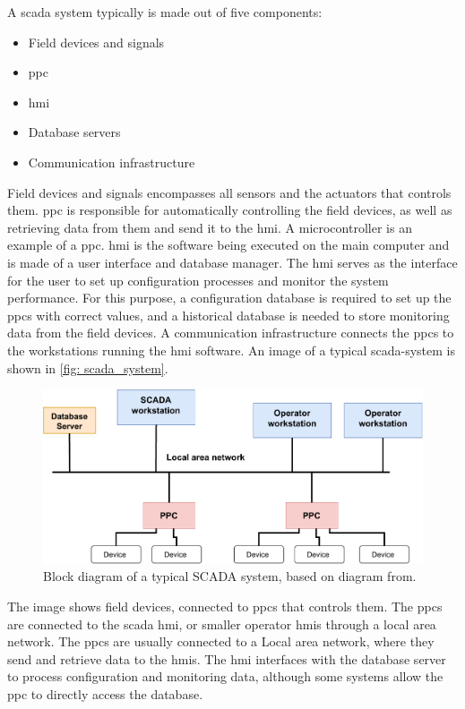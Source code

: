 \documentclass[main.tex]{subfiles}
\begin{document}
A \gls{scada} system typically is made out of five components:

\begin{itemize}
    \item Field devices and signals
    \item \acrfull{ppc}
    \item \acrfull{hmi}
    \item Database servers
    \item Communication infrastructure
\end{itemize}

Field devices and signals encompasses all sensors and the actuators that controls them. \gls{ppc} is responsible for automatically controlling the field devices, as well as retrieving data from them and send it to the \gls{hmi}. A microcontroller is an example of a \gls{ppc}. \gls{hmi} is the software being executed on the main computer and is made of a user interface and database manager. The \gls{hmi} serves as the interface for the user to set up configuration processes and monitor the system performance. For this purpose, a configuration database is required to set up the \gls{ppc}s with correct values, and a historical database is needed to store monitoring data from the field devices. A communication infrastructure connects the \gls{ppc}s to the workstations running the  \gls{hmi} software. An image of a typical \gls{scada}-system is shown in \autoref{fig: scada_system}.

\begin{figure}[!ht]
    \centering
    \includegraphics[scale=0.6]{images/scada_system.pdf}
    \caption{Block diagram of a typical SCADA system, based on diagram from\cite{scada_design}.}
    \label{fig: scada_system}
\end{figure}
\FloatBarrier

The image shows field devices, connected to \gls{ppc}s that controls them. The \gls{ppc}s are connected to the \gls{scada} \gls{hmi}, or smaller operator \gls{hmi}s through a local area network. The \gls{ppc}s are usually connected to a Local area network, where they send and retrieve data to the  \gls{hmi}s. The \gls{hmi} interfaces with the database server to process configuration and monitoring data, although some systems allow the \gls{ppc} to directly access the database.
\end{document}
